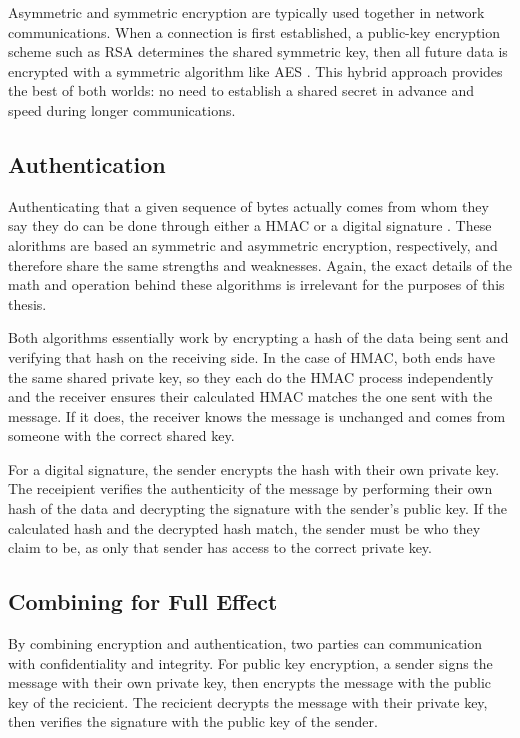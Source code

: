 \par Asymmetric and symmetric encryption are typically used together in network communications. When a connection is first established, a public-key encryption scheme such as \ac{RSA} determines the shared symmetric key, then all future data is encrypted with a symmetric algorithm like \ac{AES} \cite{HybridEncryption}. This hybrid approach provides the best of both worlds: no need to establish a shared secret in advance and speed during longer communications.

\subsection{Authentication}
\label{sec:authentication}
\par Authenticating that a given sequence of bytes actually comes from whom they say they do can be done through either a \ac{HMAC} \cite{rfc2104} or a digital signature \cite{rfc3447}. These alorithms are based an symmetric and asymmetric encryption, respectively, and therefore share the same strengths and weaknesses. Again, the exact details of the math and operation behind these algorithms is irrelevant for the purposes of this thesis. 

\par Both algorithms essentially work by encrypting a hash of the data being sent and verifying that hash on the receiving side. In the case of \ac{HMAC}, both ends have the same shared private key, so they each do the \ac{HMAC} process independently and the receiver ensures their calculated HMAC matches the one sent with the message. If it does, the receiver knows the message is unchanged and comes from someone with the correct shared key.

\par For a digital signature, the sender encrypts the hash with their own private key. The receipient verifies the authenticity of the message by performing their own hash of the data and decrypting the signature with the sender's public key. If the calculated hash and the decrypted hash match, the sender must be who they claim to be, as only that sender has access to the correct private key.

\subsection{Combining for Full Effect}
\label{sec:auth_and_encrypt}
\par By combining encryption and authentication, two parties can communication with confidentiality and integrity. For public key encryption, a sender signs the message with their own private key, then encrypts the message with the public key of the recicient. The recicient decrypts the message with their private key, then verifies the signature with the public key of the sender.


